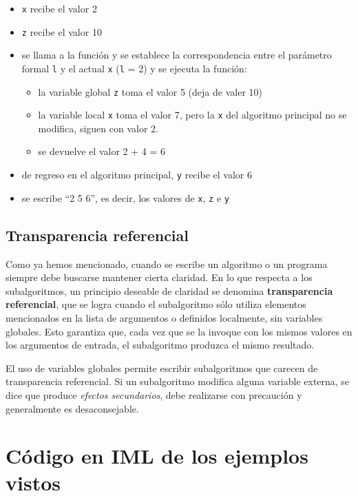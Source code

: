\documentclass[
]{book}
\providecommand{\tightlist}{%
  \setlength{\itemsep}{0pt}\setlength{\parskip}{0pt}}
\begin{document}
\begin{itemize}
\item
  \texttt{x} recibe el valor 2
\item
  \texttt{z} recibe el valor 10
\item
  se llama a la función y se establece la correspondencia entre el parámetro formal \texttt{l} y el actual \texttt{x} (\texttt{l} = 2) y se ejecuta la función:

  \begin{itemize}
  \tightlist
  \item
    la variable global \texttt{z} toma el valor 5 (deja de valer 10)
  \item
    la variable local \texttt{x} toma el valor 7, pero la \texttt{x} del algoritmo principal no se modifica, siguen con valor 2.
  \item
    se devuelve el valor 2 + 4 = 6
  \end{itemize}
\item
  de regreso en el algoritmo principal, \texttt{y} recibe el valor 6
\item
  se escribe ``2 5 6'', es decir, los valores de \texttt{x}, \texttt{z} e \texttt{y}
\end{itemize}

\hypertarget{transparencia-referencial}{%
\subsection{Transparencia referencial}\label{transparencia-referencial}}

Como ya hemos mencionado, cuando se escribe un algoritmo o un programa siempre debe buscarse mantener cierta claridad. En lo que respecta a los subalgoritmos, un principio deseable de claridad se denomina \textbf{transparencia referencial}, que se logra cuando el subalgoritmo sólo utiliza elementos mencionados en la lista de argumentos o definidos localmente, sin variables globales. Esto garantiza que, cada vez que se la invoque con los mismos valores en los argumentos de entrada, el subalgoritmo produzca el mismo resultado.

El uso de variables globales permite escribir subalgoritmos que carecen de transparencia referencial. Si un subalgoritmo modifica alguna variable externa, se dice que produce \emph{efectos secundarios}, debe realizarse con precaución y generalmente es desaconsejable.

\hypertarget{cuxf3digo-en-iml-de-los-ejemplos-vistos}{%
\section{Código en IML de los ejemplos vistos}\label{cuxf3digo-en-iml-de-los-ejemplos-vistos}}
\end{document}
